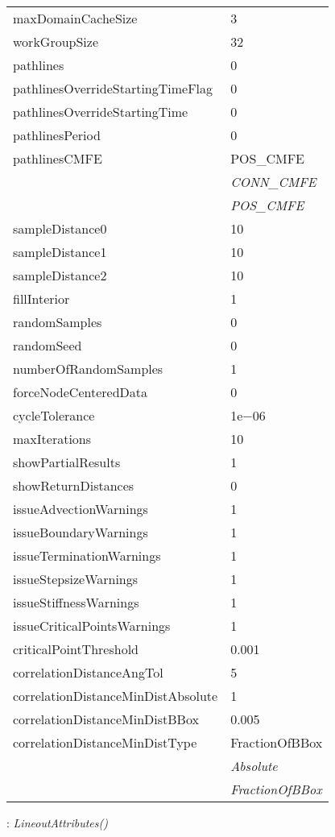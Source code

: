 \documentclass[10pt,a4paper]{report}
\begin{document}
\begin{longtable}{ll}
maxDomainCacheSize  &  3 \\
workGroupSize  &  32 \\
pathlines  &  0 \\
pathlinesOverrideStartingTimeFlag  &  0 \\
pathlinesOverrideStartingTime  &  0 \\
pathlinesPeriod  &  0 \\
pathlinesCMFE  &  POS\_CMFE   \\
 & {\it  CONN\_CMFE} \\
 & {\it  POS\_CMFE} \\
sampleDistance0  &  10 \\
sampleDistance1  &  10 \\
sampleDistance2  &  10 \\
fillInterior  &  1 \\
randomSamples  &  0 \\
randomSeed  &  0 \\
numberOfRandomSamples  &  1 \\
forceNodeCenteredData  &  0 \\
cycleTolerance  &  1e$-$06 \\
maxIterations  &  10 \\
showPartialResults  &  1 \\
showReturnDistances  &  0 \\
issueAdvectionWarnings  &  1 \\
issueBoundaryWarnings  &  1 \\
issueTerminationWarnings  &  1 \\
issueStepsizeWarnings  &  1 \\
issueStiffnessWarnings  &  1 \\
issueCriticalPointsWarnings  &  1 \\
criticalPointThreshold  &  0.001 \\
correlationDistanceAngTol  &  5 \\
correlationDistanceMinDistAbsolute  &  1 \\
correlationDistanceMinDistBBox  &  0.005 \\
correlationDistanceMinDistType  &  FractionOfBBox   \\
 & {\it  Absolute} \\
 & {\it  FractionOfBBox} \\
\end{longtable}

\newpage

{}
: {\it LineoutAttributes() }\\[-3mm]
\end{document}
